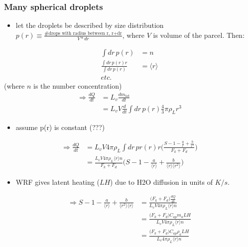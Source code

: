\documentclass{article}
\begin{document}
\subsubsection{Many spherical droplets}
\begin{itemize}
	\item let the droplets be described by size distribution $p(r)\equiv\frac{\text{\# drops with radius between r, r+dr}}{V*dr}$, where $V$ is volume of the parcel. Then:
\end{itemize}
\begin{align}
\int dr \, p(r) &= n \\
\frac{\int dr \, p(r)r}{\int dr \, p(r)} &= \langle r \rangle \\
etc. \nonumber
\end{align}
\indent(where $n$ is the number concentration)
\begin{align}
\Rightarrow \frac{dQ}{dt} &= L_v \frac{dm_{tot}}{dt} \nonumber \\
&= L_v V \frac{d}{dt} \int dr \, p(r) \frac{4}{3}\pi \rho_L r^3 
\end{align}
\begin{itemize} 
	\item assume p(r) is constant (???)
\end{itemize}
\begin{align}
\Rightarrow \frac{dQ}{dt} &= L_v V 4 \pi \rho_L \int dr \, pr(r) r \Bigg(\frac{S - 1 - \frac{a}{r} + \frac{b}{r^3}}{F_k + F_d}\Bigg) \nonumber \\
&= \frac{L_v V 4 \pi \rho_L \langle r \rangle n}{F_k + F_d} \Big(S - 1 - \frac{a}{\langle r \rangle} + \frac{b}{\langle r \rangle \langle r^2 \rangle}\Big)
\end{align}
\begin{itemize}
	\item WRF gives latent heating ($LH$) due to H2O diffusion in units of $K/s$.
\end{itemize}
\begin{align}
\label{ssry}
\Rightarrow S - 1 - \frac{a}{\langle r \rangle} + \frac{b}{\langle r^2 \rangle \langle r \rangle} &= \frac{\big(F_k + F_d\big) \frac{dQ}{dt}}{L_v V 4 \pi \rho_L \langle r \rangle n} \nonumber \\
&= \frac{\big(F_k + F_d\big) C_{ap} m_a LH}{L_v V 4 \pi \rho_L \langle r \rangle n} \nonumber \\
&= \frac{\big(F_k + F_d\big) C_{ap} \rho_a LH}{L_v 4 \pi \rho_L \langle r \rangle n} 
\end{align} 
\end{document}
